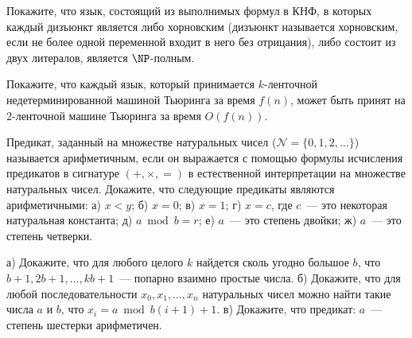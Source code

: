 \begin{task}
	Покажите, что язык, состоящий из выполнимых формул в КНФ, в которых каждый дизъюнкт является либо хорновским (дизъюнкт
    называется хорновским, если не более одной переменной входит в него без отрицания), либо состоит из двух литералов, является
    $\NP$-полным.
\end{task}


\breakline

\begin{ptask}{8}
    Покажите, что каждый язык, который принимается $k$-ленточной недетерминированной машиной Тьюринга за время $f(n)$, может быть
    принят на $2$-ленточной машине Тьюринга за время $O(f(n))$.
\end{ptask}

\begin{task}{18}
	Предикат, заданный на множестве натуральных чисел ($\mathcal{N} = \{0, 1, 2, \dots\}$) называется арифметичным, если он
    выражается с помощью формулы исчисления предикатов в сигнатуре $(+, \times, =)$ в естественной интерпретации на множестве
    натуральных чисел. Докажите, что следующие предикаты являются арифметичными: 
	а) $x < y$; б) $x = 0$; в) $x = 1$; г) $x = c$, где $c$~--- это некоторая натуральная константа; д) $a \bmod b = r$; е)
    $a$~--- это степень двойки; ж) $a$~--- это степень четверки. 
\end{task}


\begin{task}{19}
	а) Докажите, что для любого целого $k$ найдется сколь угодно большое $b$, что $b + 1, 2 b + 1, \dots, k b + 1$~--- попарно
    взаимно простые числа. б) Докажите, что для любой последовательности $x_0, x_1, \dots, x_n$ натуральных чисел можно найти
    такие числа $a$ и $b$, что $x_i = a \bmod b (i + 1) + 1$. в) Докажите, что предикат: $a$~--- степень шестерки арифметичен.    
\end{task}